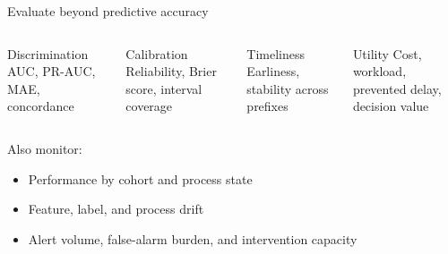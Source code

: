 \documentclass[aspectratio=169,11pt]{beamer}
\begin{document}
\begin{frame}{Evaluate beyond predictive accuracy}
  \begin{columns}[T,onlytextwidth]
      \begin{block}{Discrimination}
        AUC, PR-AUC, MAE, concordance
      \end{block}
      \begin{block}{Calibration}
        Reliability, Brier score, interval coverage
      \end{block}
      \begin{block}{Timeliness}
        Earliness, stability across prefixes
      \end{block}
      \begin{block}{Utility}
        Cost, workload, prevented delay, decision value
      \end{block}
  \end{columns}
  \vspace{0.5cm}
  Also monitor:
  \begin{itemize}
    \item Performance by cohort and process state
    \item Feature, label, and process drift
    \item Alert volume, false-alarm burden, and intervention capacity
  \end{itemize}
\end{frame}
\end{document}
